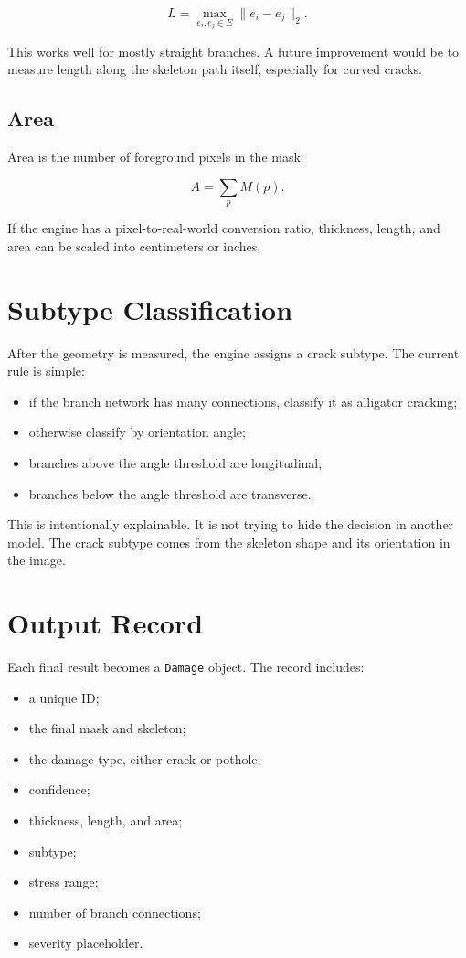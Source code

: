 \documentclass[11pt]{article}
\begin{document}
\[
L = \max_{e_i,e_j \in E}\|e_i-e_j\|_2.
\]

This works well for mostly straight branches. A future improvement would be to measure length along the skeleton path itself, especially for curved cracks.

\subsection{Area}

Area is the number of foreground pixels in the mask:

\[
A = \sum_{p} M(p).
\]

If the engine has a pixel-to-real-world conversion ratio, thickness, length, and area can be scaled into centimeters or inches.

\section{Subtype Classification}

After the geometry is measured, the engine assigns a crack subtype. The current rule is simple:

\begin{itemize}
    \item if the branch network has many connections, classify it as alligator cracking;
    \item otherwise classify by orientation angle;
    \item branches above the angle threshold are longitudinal;
    \item branches below the angle threshold are transverse.
\end{itemize}

This is intentionally explainable. It is not trying to hide the decision in another model. The crack subtype comes from the skeleton shape and its orientation in the image.

\section{Output Record}

Each final result becomes a \texttt{Damage} object. The record includes:

\begin{itemize}
    \item a unique ID;
    \item the final mask and skeleton;
    \item the damage type, either crack or pothole;
    \item confidence;
    \item thickness, length, and area;
    \item subtype;
    \item stress range;
    \item number of branch connections;
    \item severity placeholder.
\end{itemize}
\end{document}
